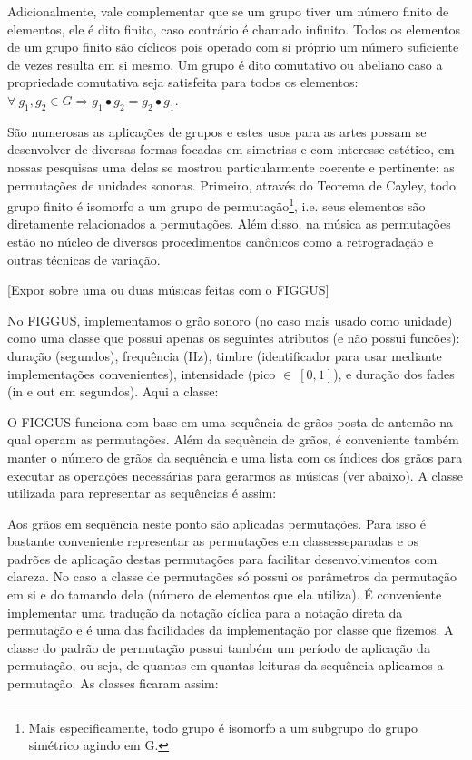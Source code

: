 Adicionalmente, vale complementar que se um grupo tiver um número
finito de elementos, ele é dito finito, caso contrário é chamado
infinito. Todos os elementos de um grupo finito são cíclicos pois
operado com si próprio um número suficiente de vezes resulta em si
mesmo. Um grupo é dito comutativo ou abeliano caso a propriedade
comutativa seja satisfeita para todos os elementos:
$\forall \ g_1, g_2 \in G \Rightarrow g_1 \bullet g_2 = g_2 \bullet g_1$.

São numerosas as aplicações de grupos e estes
usos para as artes possam se desenvolver
de diversas formas focadas em simetrias
e com interesse estético, em
nossas pesquisas uma delas se mostrou particularmente coerente
e pertinente: as permutações de unidades sonoras. Primeiro,
através do Teorema de Cayley, todo grupo finito é isomorfo
a um grupo de permutação\footnote{Mais especificamente,
todo grupo é isomorfo a um subgrupo do grupo simétrico agindo
em G.}, i.e. seus elementos são diretamente relacionados
a permutações. Além disso, na música as permutações estão
no núcleo de diversos procedimentos canônicos como a
retrogradação e outras técnicas de variação.

[Expor sobre uma ou duas músicas feitas com o FIGGUS]

No FIGGUS, implementamos o grão sonoro (no caso mais usado
como unidade) como uma classe que possui apenas
os seguintes atributos (e não possui funcões): duração (segundos),
frequência (Hz), timbre (identificador para usar mediante implementações convenientes), intensidade (pico $\in \ [0,1]$), e duração dos fades (in e out em segundos). Aqui a classe:



O FIGGUS funciona com base em uma sequência de grãos posta de antemão
na qual operam as permutações. Além da sequência de grãos,
é conveniente também manter o número de grãos da sequência e uma
lista com os índices dos grãos para executar as operações necessárias para gerarmos as músicas (ver abaixo). A classe utilizada para representar as sequências é assim:


Aos grãos em sequência neste ponto são aplicadas permutações.
Para isso é bastante conveniente representar as permutações em classesseparadas e os padrões de aplicação destas permutações para facilitar
desenvolvimentos com clareza. No caso a classe de permutações só possui os parâmetros da permutação em si e do tamando dela (número de elementos que ela utiliza). É conveniente implementar uma tradução da notação cíclica para a notação direta da permutação e é uma das facilidades da implementação por classe que fizemos. A classe do padrão de permutação possui também um período de aplicação da permutação, ou seja, de quantas em quantas leituras da sequência aplicamos a permutação. As classes ficaram assim:

